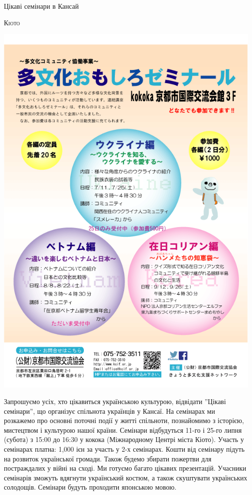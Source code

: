 \documentclass[10pt,a4paper]{article}
\newcommand{\NewsItem}[1]{%
		\usefont{T2A}{iwona}{m}{n} 
		\large #1 \vspace{4pt}
		\par \normalsize \normalfont}
\newcommand{\NewsAuthor}[1]{%
			\hfill \textsc{#1} \vspace{4pt}
			\par \normalfont}
\begin{document}
\begin{multicols}{3}
\vspace{1cm}
\NewsItem{Цікаві семінари в Кансай}
\NewsAuthor{Кіото}
		\begin{center}
			\includegraphics[width=0.8\linewidth]{images/seminary}
		\end{center}
Запрошуємо усіх, хто цікавиться українською культурою, відвідати ''Цікаві семінари'', що організує спільнота українців у Кансаї. На семінарах ми розкажемо про основні поточні події у житті спільноти, познайомимо з історією, мистецтвом і культурою нашої країни. Семінари відбудуться 11-го і 25-го липня (субота) з 15:00 до 16:30 у кокока (Міжнародному Центрі міста Кіото). Участь у семінарах платна: 1,000 ієн за участь у 2-х семінарах. Кошти від семінару підуть на розвиток української громади. Також будемо збирати пожертви для постраждалих у війні на сході. Ми готуємо багато цікавих презентацій. Учасники семінарів зможуть вдягнути український костюм, а також скуштувати українських солодощів. Семінари будуть проходити японською мовою. 
\end{multicols}

\newpage
\end{document}
